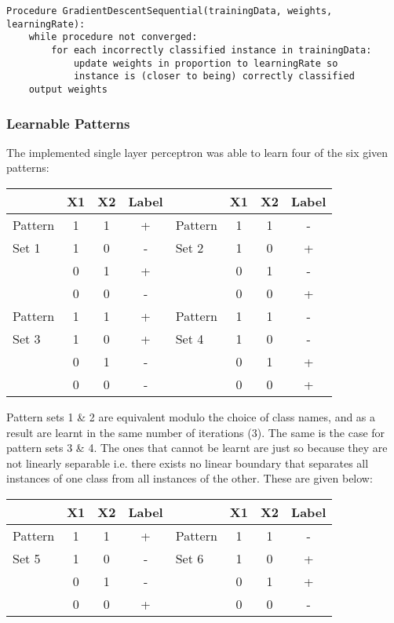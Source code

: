 \documentclass{article}
\begin{document}
\begin{verbatim}
Procedure GradientDescentSequential(trainingData, weights, learningRate):
    while procedure not converged:
        for each incorrectly classified instance in trainingData:
            update weights in proportion to learningRate so
            instance is (closer to being) correctly classified
    output weights
\end{verbatim}

\subsubsection*{Learnable Patterns}
The implemented single layer perceptron was able to learn four of the six given patterns:
\begin{center}
    \begin{tabular}{ l | c c c | l | c c c }
                & X1 & X2 & Label &         & X1 & X2 & Label \\
        \hline
        Pattern & 1  & 1  & +     & Pattern & 1  & 1  & -     \\
        Set 1   & 1  & 0  & -     & Set 2   & 1  & 0  & +     \\
                & 0  & 1  & +     &         & 0  & 1  & -     \\
                & 0  & 0  & -     &         & 0  & 0  & +     \\
        \hline
        Pattern & 1  & 1  & +     & Pattern & 1  & 1  & -     \\
        Set 3   & 1  & 0  & +     & Set 4   & 1  & 0  & -     \\
                & 0  & 1  & -     &         & 0  & 1  & +     \\
                & 0  & 0  & -     &         & 0  & 0  & +     \\
    \end{tabular}
\end{center}
Pattern sets 1 \& 2 are equivalent modulo the choice of class names, and as a result are learnt in the same number of iterations (3). The same is the case for pattern sets 3 \& 4. The ones that cannot be learnt are just so because they are not linearly separable i.e. there exists no linear boundary that separates all instances of one class from all instances of the other. These are given below:
\begin{center}
    \begin{tabular}{ l | c c c | l | c c c }
                & X1 & X2 & Label &         & X1 & X2 & Label \\
        \hline
        Pattern & 1  & 1  & +     & Pattern & 1  & 1  & -     \\
        Set 5   & 1  & 0  & -     & Set 6   & 1  & 0  & +     \\
                & 0  & 1  & -     &         & 0  & 1  & +     \\
                & 0  & 0  & +     &         & 0  & 0  & -     \\
    \end{tabular}
\end{center}
\end{document}
